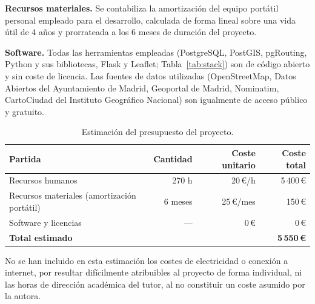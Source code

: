 \textbf{Recursos materiales.} Se contabiliza la amortización del equipo portátil personal empleado para el desarrollo, calculada de forma lineal sobre una vida útil de 4 años y prorrateada a los 6 meses de duración del proyecto.

\textbf{Software.} Todas las herramientas empleadas (PostgreSQL, PostGIS, pgRouting, Python y sus bibliotecas, Flask y Leaflet; Tabla~\ref{tab:stack}) son de código abierto y sin coste de licencia. Las fuentes de datos utilizadas (OpenStreetMap, Datos Abiertos del Ayuntamiento de Madrid, Geoportal de Madrid, Nominatim, CartoCiudad del Instituto Geográfico Nacional) son igualmente de acceso público y gratuito.

\begin{table}[htbp]
\centering
\begin{tabular}{lrrr}
\hline
\textbf{Partida} & \textbf{Cantidad} & \textbf{Coste unitario} & \textbf{Coste total} \\
\hline
Recursos humanos & 270 h & 20\,\euro/h & 5\,400\,\euro \\
Recursos materiales (amortización portátil) & 6 meses & 25\,\euro/mes & 150\,\euro \\
Software y licencias & --- & 0\,\euro & 0\,\euro \\
\hline
\textbf{Total estimado} & & & \textbf{5\,550\,\euro} \\
\hline
\end{tabular}
\caption{Estimación del presupuesto del proyecto.}
\label{tab:presupuesto}
\end{table}

No se han incluido en esta estimación los costes de electricidad o conexión a internet, por resultar difícilmente atribuibles al proyecto de forma individual, ni las horas de dirección académica del tutor, al no constituir un coste asumido por la autora.
